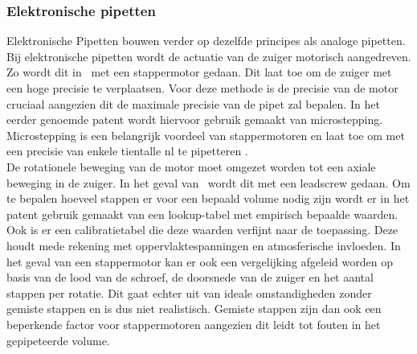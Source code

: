 \subsubsection{Elektronische pipetten}
Elektronische Pipetten bouwen verder op dezelfde principes als analoge pipetten. Bij elektronische pipetten wordt de actuatie van de zuiger motorisch aangedreven. Zo wordt dit in\ \cite{RN35} met een stappermotor gedaan. Dit laat toe om de zuiger met een hoge precisie te verplaatsen. Voor deze methode is de precisie van de motor cruciaal aangezien dit de maximale precisie van de pipet zal bepalen. In het eerder genoemde patent wordt hiervoor gebruik gemaakt van microstepping. Microstepping is een belangrijk voordeel van stappermotoren en laat toe om met een precisie van enkele tientalle nl te pipetteren . 
\\[12pt]De rotationele beweging van de motor moet omgezet worden tot een axiale beweging in de zuiger. In het geval van\ \cite{RN35} wordt dit met een leadscrew gedaan. Om te bepalen hoeveel stappen er voor een bepaald volume nodig zijn wordt er in het patent gebruik gemaakt van een lookup-tabel met empirisch bepaalde waarden. Ook is er een calibratietabel die deze waarden verfijnt naar de toepassing. Deze houdt mede rekening met oppervlaktespanningen en atmosferische invloeden. In het geval van een stappermotor kan er ook een vergelijking afgeleid worden op basis van de lood van de schroef, de doorsnede van de zuiger en het aantal stappen per rotatie. Dit gaat echter uit van ideale omstandigheden zonder gemiste stappen en is dus niet realistisch. Gemiste stappen zijn dan ook een beperkende factor voor stappermotoren aangezien dit leidt tot fouten in het gepipeteerde volume.